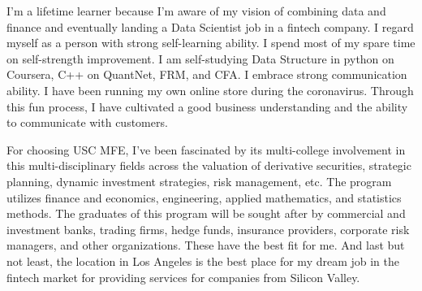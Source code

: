 \documentclass[a4paper,english]{article}
\begin{document}
I'm a lifetime learner because I'm aware of my vision of combining data and finance and eventually landing a Data Scientist job in a fintech company. I regard myself as a person with strong self-learning ability. I spend most of my spare time on self-strength improvement. I am self-studying Data Structure in python on Coursera, C++ on QuantNet, FRM, and CFA. I embrace strong communication ability. I have been running my own online store during the coronavirus. Through this fun process, I have cultivated a good business understanding and the ability to communicate with customers.

For choosing USC MFE, I've been fascinated by its multi-college involvement in this multi-disciplinary fields across the valuation of derivative securities, strategic planning, dynamic investment strategies, risk management, etc. The program utilizes finance and economics, engineering, applied mathematics, and statistics methods. The graduates of this program will be sought after by commercial and investment banks, trading firms, hedge funds, insurance providers, corporate risk managers, and other organizations. These have the best fit for me. And last but not least, the location in Los Angeles is the best place for my dream job in the fintech market for providing services for companies from Silicon Valley.
\end{document}
